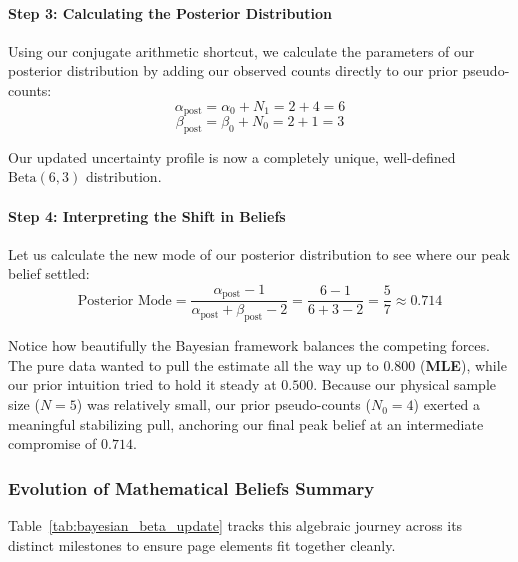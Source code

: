 \documentclass{article}
\begin{document}
\paragraph{Step 3: Calculating the Posterior Distribution}
Using our conjugate arithmetic shortcut, we calculate the parameters of our posterior distribution by adding our observed counts directly to our prior pseudo-counts:
\begin{equation}
\alpha_{\text{post}} = \alpha_0 + N_1 = 2 + 4 = 6
\end{equation}
\begin{equation}
\beta_{\text{post}} = \beta_0 + N_0 = 2 + 1 = 3
\end{equation}

Our updated uncertainty profile is now a completely unique, well-defined $\text{Beta}(6, 3)$ distribution. 

\paragraph{Step 4: Interpreting the Shift in Beliefs}
Let us calculate the new mode of our posterior distribution to see where our peak belief settled:
\begin{equation}
\text{Posterior Mode} = \frac{\alpha_{\text{post}} - 1}{\alpha_{\text{post}} + \beta_{\text{post}} - 2} = \frac{6 - 1}{6 + 3 - 2} = \frac{5}{7} \approx 0.714
\end{equation}

Notice how beautifully the Bayesian framework balances the competing forces. The pure data wanted to pull the estimate all the way up to $0.800$ (\textbf{MLE}), while our prior intuition tried to hold it steady at $0.500$. Because our physical sample size ($N=5$) was relatively small, our prior pseudo-counts ($N_0=4$) exerted a meaningful stabilizing pull, anchoring our final peak belief at an intermediate compromise of $0.714$.

\subsubsection{Evolution of Mathematical Beliefs Summary}
Table~\ref{tab:bayesian_beta_update} tracks this algebraic journey across its distinct milestones to ensure page elements fit together cleanly.
\end{document}
